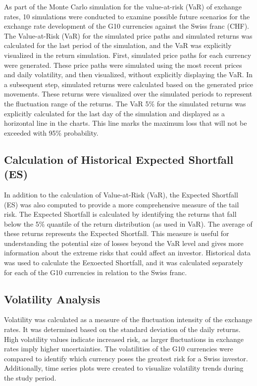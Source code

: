\documentclass{article}
\begin{document}
As part of the Monte Carlo simulation for the value-at-risk (VaR) of exchange rates, 10 simulations were conducted to examine possible future scenarios for the exchange rate development of the G10 currencies against the Swiss franc (CHF). The Value-at-Risk (VaR) for the simulated price paths and simulated returns was calculated for the last period of the simulation, and the VaR was explicitly visualized in the return simulation.
First, simulated price paths for each currency were generated. These price paths were simulated using the most recent prices and daily volatility, and then visualized, without explicitly displaying the VaR.
In a subsequent step, simulated returns were calculated based on the generated price movements. These returns were visualized over the simulated periods to represent the fluctuation range of the returns. The VaR 5\% for the simulated returns was explicitly calculated for the last day of the simulation and displayed as a horizontal line in the charts. This line marks the maximum loss that will not be exceeded with 95\% probability.

\subsection{Calculation of Historical Expected Shortfall (ES)}

In addition to the calculation of Value-at-Risk (VaR), the Expected Shortfall (ES) was also computed to provide a more comprehensive measure of the tail risk. The Expected Shortfall is calculated by identifying the returns that fall below the 5\% quantile of the return distribution (as used in VaR). The average of these returns represents the Expected Shortfall. This measure is useful for understanding the potential size of losses beyond the VaR level and gives more information about the extreme risks that could affect an investor. Historical data was used to calculate the Eexoected Shortfall, and it was calculated separately for each of the G10 currencies in relation to the Swiss franc.

\subsection{Volatility Analysis}

Volatility was calculated as a measure of the fluctuation intensity of the exchange rates. It was determined based on the standard deviation of the daily returns. High volatility values indicate increased risk, as larger fluctuations in exchange rates imply higher uncertainties. The volatilities of the G10 currencies were compared to identify which currency poses the greatest risk for a Swiss investor. Additionally, time series plots were created to visualize volatility trends during the study period.
\end{document}
